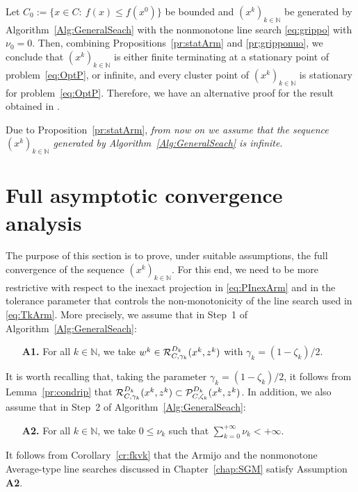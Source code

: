 \begin{remark}\normalfont
	Let  $C_{0}:=\{ x\in C: ~ f(x)\leq f(x^0) \}$ be  bounded and    $(x^k)_{k\in\mathbb{N}}$ be  generated by Algorithm~\ref{Alg:GeneralSeach} with the  nonmonotone line  search \eqref{eq:grippo} with $\nu_0= 0$.     Then, combining Propositions~\ref{pr:statArm} and \ref{pr;gripponuo}, we conclude that  $(x^k)_{k\in\mathbb{N}}$  is either finite terminating at a stationary point of problem~\eqref{eq:OptP}, or infinite,  and every cluster point of $(x^k)_{k\in\mathbb{N}}$ is stationary for problem~\eqref{eq:OptP}.  Therefore, we have an alternative proof for the result obtained in \cite[Theorem 2.1]{BirginMartinezRaydan2003}.
\end{remark}\normalfont
Due to Proposition~\ref{pr:statArm}, {\it from now on we assume that the sequence $(x^k)_{k\in\mathbb{N}}$ generated by Algorithm~\ref{Alg:GeneralSeach} is infinite}.


\section{Full asymptotic convergence  analysis } \label{SubSec:CAnalysisAF}

The purpose of this section is to prove, under suitable assumptions, the full convergence of the  sequence $(x^k)_{k\in\mathbb{N}}$.   For this end,  we need to be more restrictive with respect to the inexact projection in \eqref{eq:PInexArm} and in the tolerance parameter that controls the non-monotonicity of the line search used in \eqref{eq:TkArm}. More precisely,  we   assume  that in Step~1  of  Algorithm~\ref{Alg:GeneralSeach}:


\begin{itemize}
	\item[{\bf A1.}] For all $k \in \mathbb{N}$, we take   $w^k \in   {\cal R}_{C,\gamma_k}^{D_k}(x^{k}, z^k)$   with $\gamma_k=(1-\zeta_k)/2$.
\end{itemize}
It is worth recalling  that, taking   the parameter $\gamma_k=(1-\zeta_k)/2 $, it follows from Lemma~\ref{pr:condrip} that  $ {\cal R}_{C,\gamma_k}^{D_k}(x^{k}, z^k) \subset {\cal P}_{C, \zeta_k}^{D_k}(x^{k}, z^k)$. In addition, we also assume that   in Step~2 of  Algorithm~\ref{Alg:GeneralSeach}:
\begin{itemize}
	\item[{\bf A2.}]For all $k \in \mathbb{N}$,  we take  $0\leq \nu_{k}$ such that  $\sum_{k=0}^{+\infty} \nu_k<+\infty$.
\end{itemize}
It follows from Corollary~\ref{cr:fkvk} that the Armijo and the nonmonotone Average-type line searches discussed in Chapter~\ref{chap:SGM} satisfy  Assumption {\bf A2}.


